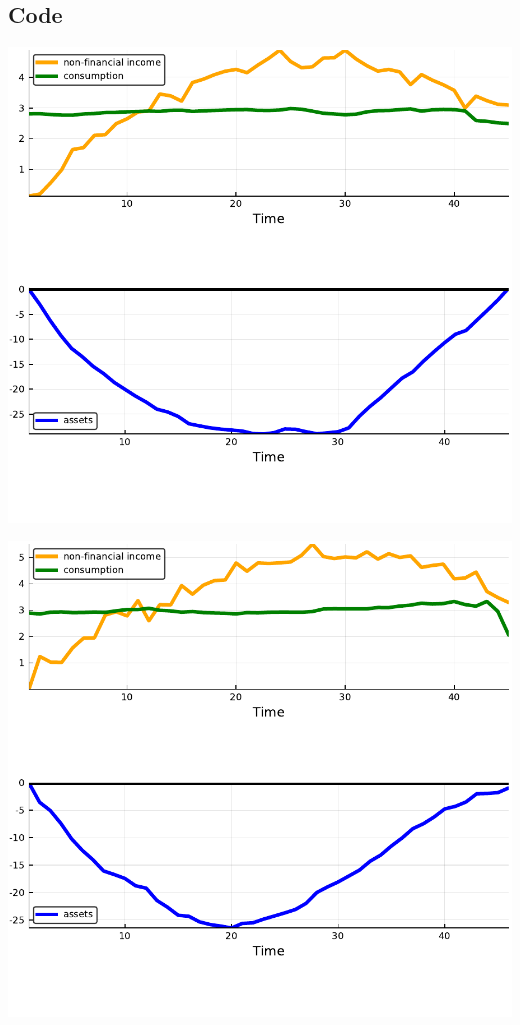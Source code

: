 \documentclass[10pt]{paper}
\begin{document}
\subsection*{Code}


\includegraphics[width=\linewidth]{figures/questions_4_1.pdf}

\includegraphics[width=\linewidth]{figures/questions_5_1.pdf}
\end{document}
